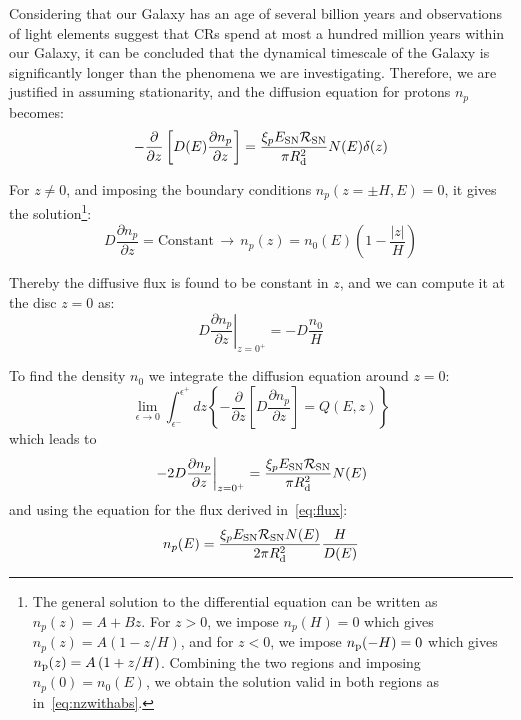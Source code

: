 Considering that our Galaxy has an age of several billion years and observations of light elements suggest that CRs spend at most a hundred million years within our Galaxy, it can be concluded that the dynamical timescale of the Galaxy is significantly longer than the phenomena we are investigating. Therefore, we are justified in assuming stationarity, and the diffusion equation for protons $n_p$ becomes:
%
\begin{equation}
-\frac{\partial}{\partial z}\left[ D(E) \frac{\partial n_p}{\partial z}\right] = \frac{\xi_p E_{\rm SN} \mathcal R_{\rm SN}}{\pi R_{\rm d}^2} N(E) \delta(z)
\label{eq:protons}
\end{equation}

For $z \ne 0$, and imposing the boundary conditions $n_p(z = \pm H, E) = 0$, it gives the solution\footnote{The general solution to the differential equation can be written as $n_p(z)=A+Bz$. For $z>0$, we impose $n_p(H)=0$ which gives $n_p(z)=A\left(1- z/H\right)$, and for $z<0$, we impose $n_{\rm p}(-H)=0$ which gives $n_{\rm p}(z)=A\left(1+ z/H\right)$. Combining the two regions and imposing $n_p(0)=n_0(E)$, we obtain the solution valid in both regions as in~\ref{eq:nzwithabs}.}:
%
\begin{equation}
D \frac{\partial n_p}{\partial z} = \text{Constant} \, \longrightarrow \, n_p(z) = n_0(E) \left( 1 - \frac{|z|}{H} \right)
\label{eq:nzwithabs}
\end{equation}

Thereby the diffusive flux is found to be constant in $z$, and we can compute it at the disc $z = 0$ as:
%
\begin{equation}
\left. D \frac{\partial n_p}{\partial z}\right|_{z=0^+} = - D \frac{n_{0}}{H}
\label{eq:flux}
\end{equation}

To find the density $n_0$ we integrate the diffusion equation around $z=0$:
%
\begin{equation}
\lim_{\epsilon\rightarrow0} \int_{\epsilon^-}^{\epsilon^+} \!\!\! dz 
\left\{ -\frac{\partial}{\partial z} \left[ D \frac{\partial n_p}{\partial z} \right] = Q(E,z) \right\} 
\end{equation}
%
which leads to
%
\begin{equation}
\left. -2D \frac{\partial n_p}{\partial z}\right|_{z=0^+} = \frac{\xi_p E_{\rm SN} \mathcal R_{\rm SN}}{\pi R_{\rm d}^2} N(E) 
\end{equation}
%
and using the equation for the flux derived in~\ref{eq:flux}:
%
\begin{equation}
n_p(E) = \frac{\xi_p E_{\rm SN} \mathcal R_{\rm SN} N(E)}{2 \pi R_{\rm d}^2}  \frac{H}{D(E)} 
\label{eq:protonsimplesolution}
\end{equation}

